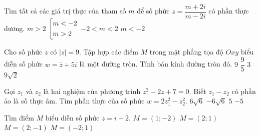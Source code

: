 \begin{ex}%
	Tìm tất cả các giá trị thực của tham số $m$ để số phức $z=\dfrac{m+2i}{m-2i}$ có phần thực dương.
	\choice 
	{$m>2$}
	{\True $\left[\begin{aligned}&m<-2\\&m>2\end{aligned}\right.$}
	{$-2<m<2$}
	{$m<-2$}
\end{ex}

\begin{ex}%
	Cho số phức $z$ có $|z|=9$. Tập hợp các điểm $M$ trong mặt phẳng tọa độ $Oxy$ biểu diễn số phức $w=\bar{z} + 5i$ là một đường tròn. Tính bán kính đường tròn đó.
	\choice 
	{\True $9$}
	{$\dfrac{9}{5}$}
	{$3$}
	{$9\sqrt{2}$}
\end{ex}

\begin{ex}%
	Gọi $z_1$ và $z_2$ là hai nghiệm của phương trình $z^2-2z+7=0$. Biết $z_1-z_2$ có phần ảo là số thực âm. Tìm phần thực của số phức $w=2z_1^2 - z_2^2$.
	\choice 
	{$6\sqrt{6}$}
	{$-6\sqrt{6}$}
	{$5$}
	{\True $-5$}
\end{ex}

\begin{ex}%
Tìm điểm $M$ biểu diễn số phức $z=i-2$.
\choice 
{$M=(1;-2)$}
{$M=(2;1)$}
{$M=(2;-1)$}
{\True $M=(-2;1)$}  
\end{ex} 

